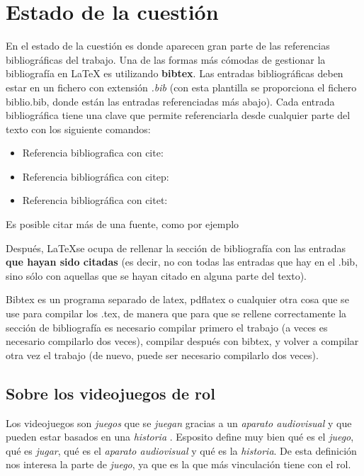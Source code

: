 \chapter{Estado de la cuestión}
\label{cap:estadoDeLaCuestion}

En el estado de la cuestión es donde aparecen gran parte de las referencias bibliográficas del trabajo. Una de las formas más cómodas de gestionar la bibliografía en {\LaTeX} es utilizando \textbf{bibtex}. Las entradas bibliográficas deben estar en un fichero con extensión \textit{.bib} (con esta plantilla se proporciona el fichero biblio.bib, donde están las entradas referenciadas más abajo). Cada entrada bibliográfica tiene una clave que permite referenciarla desde cualquier parte del texto con los siguiente comandos:

\begin{itemize}
\item Referencia bibliografica con cite: \cite{ldesc2e}
\item Referencia bibliográfica con citep: \citep{notsoshort}
\item Referencia bibliográfica con citet: \citet{latexAPrimer}
\end{itemize}

Es posible citar más de una fuente, como por ejemplo \citep{latexCompanion,LaTeXLamport,texKnuth}

Después, \LaTeX se ocupa de rellenar la sección de bibliografía con las entradas \textbf{que hayan sido citadas} (es decir, no con todas las entradas que hay en el .bib, sino sólo con aquellas que se hayan citado en alguna parte del texto).

Bibtex es un programa separado de latex, pdflatex o cualquier otra cosa que se use para compilar los .tex, de manera que para que se rellene correctamente la sección de bibliografía es necesario compilar primero el trabajo (a veces es necesario compilarlo dos veces), compilar después con bibtex, y volver a compilar otra vez el trabajo (de nuevo, puede ser necesario compilarlo dos veces).

\section{Sobre los videojuegos de rol}
Los videojuegos son \textit{juegos} que se \textit{juegan} gracias a un \textit{aparato audiovisual} y que pueden estar basados en una \textit{historia} \citep{EspositoVJ}. Esposito define muy bien qué es el \textit{juego}, qué es \textit{jugar}, qué es el \textit{aparato audiovisual} y qué es la \textit{historia}. De esta definición nos interesa la parte de \textit{juego}, ya que es la que más vinculación tiene con el rol.

